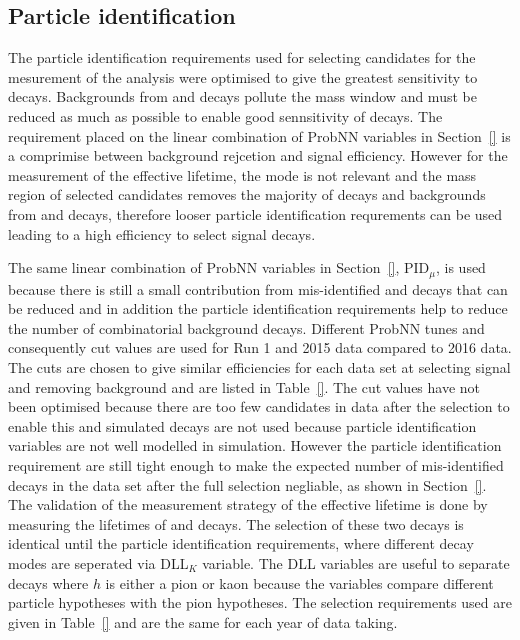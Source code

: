 \subsection{Particle identification}
\label{sec:ELpid}
The particle identification requirements used for selecting candidates for the mesurement of the \BF analysis were optimised to give the greatest sensitivity to \bdmumu decays. Backgrounds from \bhh and \lambdab decays pollute the \bd mass window and must be reduced as much as possible to enable good sennsitivity of \bdmumu decays. The requirement placed on the linear combination of ProbNN variables in Section~\ref{} is a comprimise between background rejcetion and signal efficiency. However for the measurement of the \bsmumu effective lifetime, the \bd mode is not relevant and the mass region of selected candidates removes the majority of \bdmumu decays and backgrounds from \bhh and \lambdab decays, therefore looser particle identification requrements can be used leading to a high efficiency to select signal decays.  

The same linear combination of ProbNN variables in Section~\ref{}, PID$_{\mu}$, is used because there is still a small contribution from mis-identified \bhh and \lambdab decays that can be reduced and in addition the particle identification requirements help to reduce the number of combinatorial background decays. Different ProbNN tunes and consequently cut values are used for Run 1 and 2015 data compared to 2016 data. The cuts are chosen to give similar efficiencies for each data set at selecting signal and removing background and are listed in Table~\ref{}. The cut values have not been optimised because there are too few candidates in data after the selection to enable this and simulated decays are not used because particle identification variables are not well modelled in simulation. However the particle identification requirement are still tight enough to make the expected number of mis-identified decays in the data set after the full selection negliable, as shown in Section~\ref{}. 
The validation of the measurement strategy of the \bsmumu effective lifetime is done by measuring the lifetimes of \bdkpi and \bskk decays. The selection of these two \bhh decays is identical until the particle identification requirements, where different decay modes are seperated via DLL$_{K}$ variable. The DLL variables are useful to separate \bhh decays where $h$ is either a pion or kaon because the variables compare different particle hypotheses with the pion hypotheses. The selection requirements used are given in Table~\ref{} and are the same for each year of data taking.


